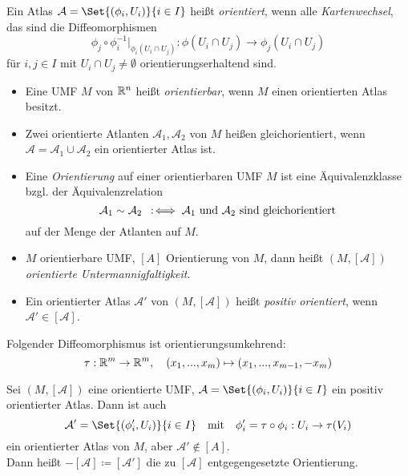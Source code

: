 \documentclass{cheat-sheet}
\newcommand{\Atlas}{\mathcal{A}} %
\theoremstyle{definition}
\begin{document}
\begin{defn}
  Ein Atlas $\Atlas = \Set{ (\phi_i, U_i) }{ i \in I }$ heißt \emph{orientiert}, wenn alle \emph{Kartenwechsel}, das sind die Diffeomorphismen
  \[ \phi_j \circ \phi_i^{-1} |_{\phi_i(U_i \cap U_j)} : \phi(U_i \cap U_j) \to \phi_j(U_i \cap U_j) \]
  für $i, j \in I$ mit $U_i \cap U_j \not= \emptyset$ orientierungserhaltend sind.
\end{defn}

\begin{defn}
  \begin{itemize}
    \item Eine UMF $M$ von $\mathbb{R}^n$ heißt \emph{orientierbar}, wenn $M$ einen orientierten Atlas besitzt.
    \item Zwei orientierte Atlanten $\Atlas_1, \Atlas_2$ von $M$ heißen gleichorientiert, wenn $\Atlas = \Atlas_1 \cup \Atlas_2$ ein orientierter Atlas ist.
    \item Eine \emph{Orientierung} auf einer orientierbaren UMF $M$ ist eine Äquivalenzklasse bzgl. der Äquivalenzrelation
    \[ \Atlas_1 \sim \Atlas_2 \coloniff \text{$\Atlas_1$ und $\Atlas_2$ sind gleichorientiert} \]
    auf der Menge der Atlanten auf $M$.
    \item $M$ orientierbare UMF, $[A]$ Orientierung von $M$, dann heißt $(M, [\Atlas])$ \emph{orientierte Untermannigfaltigkeit}.
    \item Ein orientierter Atlas $\Atlas'$ von $(M, [\Atlas])$ heißt \emph{positiv orientiert}, wenn $\Atlas' \in [\Atlas]$.
  \end{itemize}
\end{defn}


\begin{nota}
  Folgender Diffeomorphismus ist orientierungsumkehrend:
  \[ \tau : \mathbb{R}^m \to \mathbb{R}^m, \quad (x_1, ..., x_m) \mapsto (x_1, ..., x_{m-1}, - x_m) \]
\end{nota}

\begin{defn}
  Sei $(M, [\Atlas])$ eine orientierte UMF, $\Atlas = \Set{ (\phi_i, U_i) }{ i \in I }$ ein positiv orientierter Atlas. Dann ist auch
  \[
    \Atlas' = \Set{ (\phi_i', U_i) }{ i \in I }
    \quad \text{mit} \quad
    \phi_i' = \tau \circ \phi_i : U_i \to \tau(V_i)
  \]
  ein orientierter Atlas von $M$, aber $\Atlas' \not\in [A]$.\\
  Dann heißt $-[\Atlas] \coloneqq [\Atlas']$ die zu $[\Atlas]$ entgegengesetzte Orientierung.
\end{defn}
\end{document}
